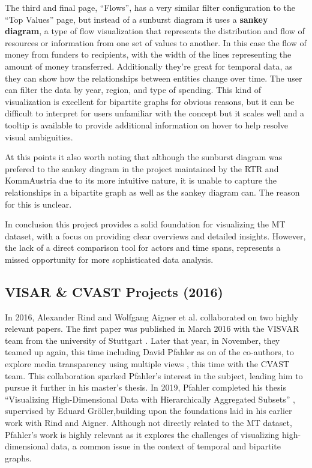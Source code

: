 \documentclass{vgtc}
\begin{document}
The third and final page, ``Flows'', has a very similar filter configuration to the ``Top Values'' page, but instead of a sunburst diagram it uses a \textbf{sankey diagram}, a type of flow visualization that represents the distribution and flow of resources or information from one set of values to another. In this case the flow of money from funders to recipients, with the width of the lines representing the amount of money transferred. Additionally they're great for temporal data, as they can show how the relationships between entities change over time. The user can filter the data by year, region, and type of spending. This kind of visualization is excellent for bipartite graphs for obvious reasons, but it can be difficult to interpret for users unfamiliar with the concept \textendash{} but it scales well and a tooltip is available to provide additional information on hover to help resolve visual ambiguities.

At this points it also worth noting that although the sunburst diagram was prefered to the sankey diagram in the project maintained by the RTR and KommAustria due to its more intuitive nature, it is unable to capture the relationships in a bipartite graph as well as the sankey diagram can. The reason for this is unclear.

In conclusion this project provides a solid foundation for visualizing the MT dataset, with a focus on providing clear overviews and detailed insights. However, the lack of a direct comparison tool for actors and time spans, represents a missed opportunity for more sophisticated data analysis.

\subsection{VISAR \& CVAST Projects (2016)}

In 2016, Alexander Rind and Wolfgang Aigner et al. collaborated on two highly relevant papers. The first paper was published in March 2016 with the VISVAR team from the university of Stuttgart \cite{aigner2016visual}. Later that year, in November, they teamed up again, this time including David Pfahler as on of the co-authors, to explore media transparency using multiple views \cite{rind2016exploring}, this time with the CVAST team. This collaboration sparked Pfahler's interest in the subject, leading him to pursue it further in his master's thesis. In 2019, Pfahler completed his thesis ``Visualizing High-Dimensional Data with Hierarchically Aggregated Subsets'' \cite{pfahlerflexible}, supervised by Eduard Gröller,building upon the foundations laid in his earlier work with Rind and Aigner. Although not directly related to the MT dataset, Pfahler's work is highly relevant as it explores the challenges of visualizing high-dimensional data, a common issue in the context of temporal and bipartite graphs.
\end{document}

